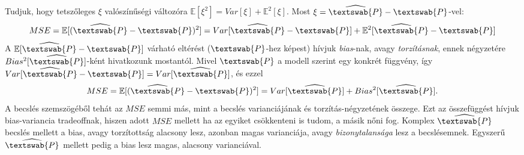 \documentclass[14p]{report}
\begin{document}
	\\
	\\
	Tudjuk, hogy tetszőleges $\xi$ valószínűségi változóra $\mathbb{E}[\xi^2] = Var[\xi] + \mathbb{E}^2[\xi]$. Most $\xi = \widehat{\textswab{P}} - \textswab{P}$-vel:
	\[
		MSE = \mathbb{E}[(\widehat{\textswab{P}} - \textswab{P})^2] = Var[\widehat{\textswab{P}} - \textswab{P}] + \mathbb{E}^2[\widehat{\textswab{P}} - \textswab{P}]
	\]
	A $\mathbb{E}[\widehat{\textswab{P}} - \textswab{P}]$ várható eltérést ($\textswab{P}$-hez képest) hívjuk \emph{bias}-nak, avagy \emph{torzításnak}, ennek négyzetére $Bias^2[\widehat{\textswab{P}}]$-ként hivatkozunk mostantól. Mivel $\textswab{P}$ a modell szerint egy konkrét függvény, így $Var[\widehat{\textswab{P}} - \textswab{P}] = Var[\widehat{\textswab{P}}]$, és ezzel
	\[
		MSE = \mathbb{E}[(\widehat{\textswab{P}} - \textswab{P})^2] = Var[\widehat{\textswab{P}}] + Bias^2[\widehat{\textswab{P}}].
	\]
	A becslés szemszögéből tehát az $MSE$ semmi más, mint a becslés varianciájának és torzítás-négyzetének összege. Ezt az összefüggést hívjuk bias-variancia tradeoffnak, hiszen adott $MSE$ mellett ha az egyiket csökkenteni is tudom, a másik nőni fog. Komplex $\widehat{\textswab{P}}$ becslés mellett a bias, avagy torzítottság alacsony lesz, azonban magas varianciája, avagy \emph{bizonytalansága} lesz a becslésemnek. Egyszerű $\widehat{\textswab{P}}$ mellett pedig a bias lesz magas, alacsony varianciával.
	
\end{document}
